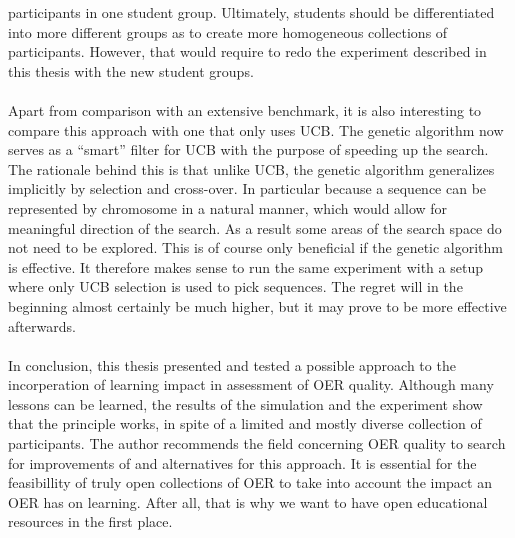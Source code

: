 participants in one student group. Ultimately, students should be
differentiated into more different groups as to create more homogeneous
collections of participants. However, that would require to redo the experiment
described in this thesis with the new student groups.\\\\
\noindent
Apart from comparison with an extensive benchmark, it is also interesting to
compare this approach with one that only uses UCB. The genetic algorithm now
serves as a ``smart'' filter for UCB with the purpose of speeding up the
search. The rationale behind this is that unlike UCB, the genetic algorithm
generalizes implicitly by selection and cross-over. In particular because a
sequence can be represented by chromosome in a natural manner, which would
allow for meaningful direction of the search. As a result some areas of the
search space do not need to be explored. This is of course only beneficial if
the genetic algorithm is effective. It therefore makes sense to run the same
experiment with a setup where only UCB selection is used to pick sequences. The
regret will in the beginning almost certainly be much higher, but it may prove
to be more effective afterwards.\\\\
\noindent
In conclusion, this thesis presented and tested a possible approach to the
incorperation of learning impact in assessment of OER quality. Although many lessons can be learned, the
results of the simulation and the experiment show that the principle works, in
spite of a limited and mostly diverse collection of participants. The author
recommends the field concerning OER quality to search for improvements of and
alternatives for this approach. It is essential for the feasibillity of truly
open collections of OER to take into account the impact an OER has on learning.
After all, that is why we want to have open educational resources in the first
place.
